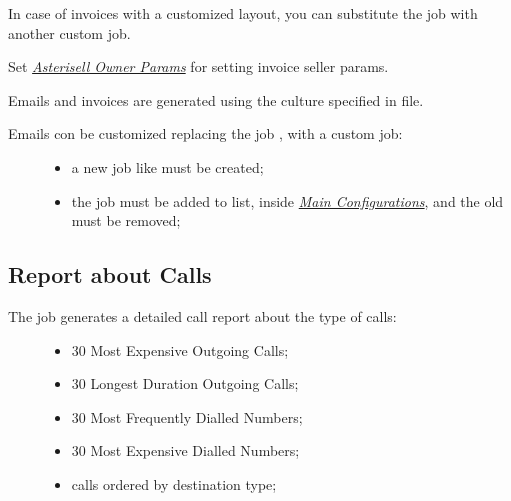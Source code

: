 \documentclass[letterpaper,10pt,english]{sphinxmanual}
\begin{document}
In case of invoices with a customized layout, you can substitute the job  with another custom job.

Set {\hyperref[index:asterisell-owner]{\emph{Asterisell Owner Params}}} for setting invoice seller params.

Emails and invoices are generated using the culture specified in  file.
\begin{description}
\item[{Emails con be customized replacing the job , with a custom job:}] \leavevmode\begin{itemize}
\item {} 
a new job like  must be created;

\item {} 
the job must be added to  list, inside {\hyperref[index:main-configurations]{\emph{Main Configurations}}}, and the old  must be removed;

\end{itemize}

\end{description}


\subsection{Report about Calls}
\label{index:report-about-calls}\begin{description}
\item[{The job  generates a detailed call report about the type of calls:}] \leavevmode\begin{itemize}
\item {} 
30 Most Expensive Outgoing Calls;

\item {} 
30 Longest Duration Outgoing Calls;

\item {} 
30 Most Frequently Dialled Numbers;

\item {} 
30 Most Expensive Dialled Numbers;

\item {} 
calls ordered by destination type;

\end{itemize}

\end{description}
\end{document}
